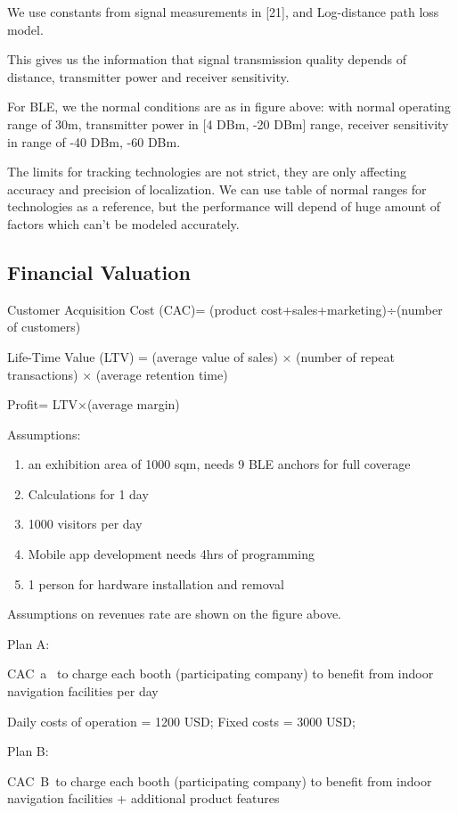 We use constants from signal measurements in [21], and Log-distance path loss model.

This gives us the information that signal transmission quality depends of distance, transmitter power and receiver sensitivity.

For BLE, we the normal conditions are as in figure above: with normal operating range of 30m, transmitter power in [4 DBm, -20 DBm] range, receiver sensitivity in range of -40 DBm, -60 DBm.

The limits for tracking technologies are not strict, they are only affecting accuracy and precision of localization. We can use table of normal ranges for technologies as a reference, but the performance will depend of huge amount of factors which can't be modeled accurately.

\subsection{Financial Valuation}

Customer Acquisition Cost (CAC)= (product cost+sales+marketing)÷(number of customers)

Life-Time Value (LTV) = (average value of sales) × (number of repeat transactions) × (average retention time)

Profit= LTV×(average margin)

Assumptions: 

\begin{enumerate}
    \item     an exhibition area of 1000 sqm, needs 9 BLE anchors for full coverage
    \item     Calculations for 1 day
    \item     1000 visitors per day
    \item     Mobile app development needs 4hrs of programming
    \item     1 person for hardware installation and removal
\end{enumerate}

Assumptions on revenues rate are shown on the figure above.

Plan A:

CAC~a~ to charge each booth (participating company) to benefit from indoor navigation facilities per day

Daily costs of operation = 1200 USD; Fixed costs = 3000 USD;

Plan B:

CAC~B~to charge each booth (participating company) to benefit from indoor navigation facilities + additional product features

